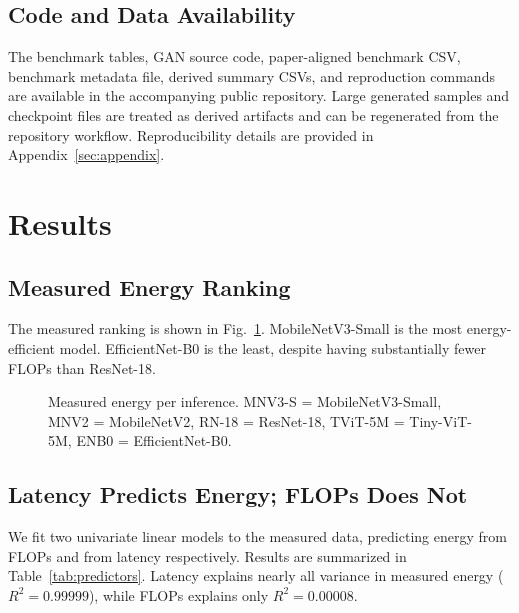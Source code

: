 \documentclass[conference]{IEEEtran}
\begin{document}
\subsection{Code and Data Availability}
The benchmark tables, GAN source code, paper-aligned benchmark CSV, benchmark
metadata file, derived summary CSVs, and reproduction commands are available
in the accompanying public repository. Large generated samples and checkpoint
files are treated as derived artifacts and can be regenerated from the
repository workflow.
Reproducibility details are provided in Appendix~\ref{sec:appendix}.

\section{Results}

\subsection{Measured Energy Ranking}
The measured ranking is shown in Fig.~\ref{fig:measured-energy}.
MobileNetV3-Small is the most energy-efficient model. EfficientNet-B0 is the
least, despite having substantially fewer FLOPs than ResNet-18.

\begin{figure}[ht]
\centering
{}
\caption{Measured energy per inference. MNV3-S = MobileNetV3-Small, MNV2 = MobileNetV2, RN-18 = ResNet-18, TViT-5M = Tiny-ViT-5M, ENB0 = EfficientNet-B0.}
\label{fig:measured-energy}
\end{figure}

\subsection{Latency Predicts Energy; FLOPs Does Not}
\label{sec:predictors}
We fit two univariate linear models to the measured data, predicting energy
from FLOPs and from latency respectively. Results are summarized in
Table~\ref{tab:predictors}. Latency explains nearly all variance in measured
energy ($R^2 = 0.99999$), while FLOPs explains only $R^2 = 0.00008$.
\end{document}
